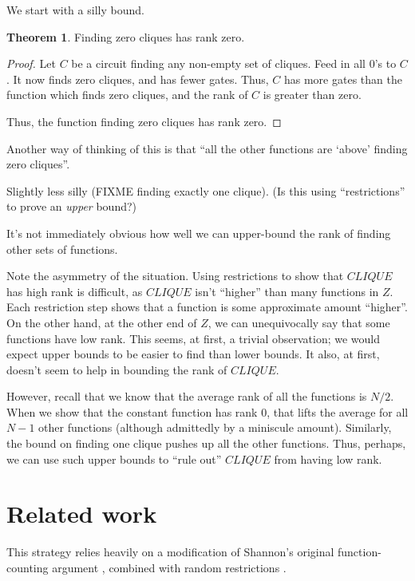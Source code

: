 \documentclass[12pt]{article}
\theoremstyle{definition}
\newtheorem{thm}{Theorem}[section]
\begin{document}
We start with a silly bound.

\begin{thm}
\label{zeroCliques}
Finding zero cliques has rank zero.
\end{thm}
\begin{proof}

Let $C$ be a circuit finding any non-empty set of cliques.
Feed in all 0's to $C$. It now finds zero cliques, and has
fewer gates. Thus, $C$ has more gates than the function
which finds zero cliques, and the rank of $C$ is greater
than zero.

Thus, the function finding zero cliques has rank zero.

\end{proof}
 
Another way of thinking of this is that ``all the other functions
are `above' finding zero cliques''.

Slightly less silly (FIXME finding exactly one clique).
(Is this using ``restrictions'' to prove an {\em upper} bound?)

It's not immediately obvious how well we can upper-bound the rank
of finding other sets of functions.

Note the asymmetry of the situation. Using restrictions to show that
$CLIQUE$ has high rank is difficult, as $CLIQUE$ isn't ``higher'' than
many functions in $Z$. Each restriction step shows that a function is
some approximate amount ``higher''.
On the other hand, at the other end of $Z$, we can unequivocally say
that some functions have low rank.
This seems, at first, a trivial observation; we would expect upper bounds
to be easier to find than lower bounds. It also, at first, doesn't seem
to help in bounding the rank of $CLIQUE$.

However, recall that we know that the average rank of all the functions
is $N/2$.
When we show that the constant function has rank 0, that lifts
the average for all $N-1$ other functions (although admittedly
by a miniscule amount).
Similarly, the bound on finding one clique pushes up all the other functions.
Thus, perhaps, we can use such upper bounds to ``rule out'' $CLIQUE$ from
having low rank.

\section{Related work}

This strategy relies heavily on a modification of Shannon's original
function-counting argument \cite{shannon_synthesis_1949},
combined with random restrictions
\cite{subbotovskaya1963comparison} \cite{hastad1987lower}.
\end{document}
